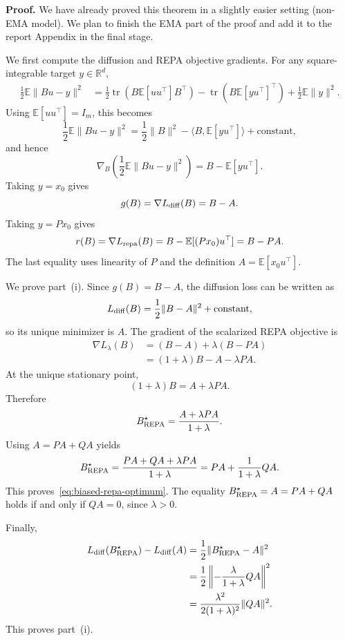 \textbf{Proof.} We have already proved this theorem in a slightly easier setting (non-EMA model).
We plan to finish the EMA part of the proof and add it to the report Appendix in the final stage.

We first compute the diffusion and REPA objective gradients. For any square-integrable target
$y\in\mathbb R^d$,
\begin{align*}
    \frac12\mathbb E\|Bu-y\|^2
    &=
    \frac12\operatorname{tr}\!\left(B\mathbb E[uu^\top]B^\top\right)
    -\operatorname{tr}\!\left(B\mathbb E[yu^\top]^\top\right)
    +\frac12\mathbb E\|y\|^2 .
\end{align*}
Using $\mathbb E[uu^\top]=I_m$, this becomes
\[
    \frac12\mathbb E\|Bu-y\|^2
    =
    \frac12\|B\|^2
    -\langle B,\mathbb E[yu^\top]\rangle
    +\text{constant},
\]
and hence
\begin{equation}
    \nabla_B\left(\frac12\mathbb E\|Bu-y\|^2\right)
    =
    B-\mathbb E[yu^\top].
    \label{eq:generic-gradient}
\end{equation}
Taking $y=x_0$ gives
\begin{equation}
    g(B)=\nabla L_{\rm diff}(B)=B-A .
    \label{eq:g-gradient}
\end{equation}
Taking $y=Px_0$ gives
\begin{equation}
    r(B)=\nabla L_{\rm repa}(B)
    = B-\mathbb E[(Px_0)u^\top]
    = B-PA .
    \label{eq:r-gradient}
\end{equation}
The last equality uses linearity of $P$ and the definition $A=\mathbb E[x_0u^\top]$.

We prove part~\textup{(i)}. Since $g(B)=B-A$, the diffusion loss can be written
as
\[
    L_{\rm diff}(B)=\frac12\|B-A\|^2+\text{constant},
\]
so its unique minimizer is $A$. The gradient of the scalarized REPA objective is
\begin{align*}
    \nabla L_\lambda(B)
    &=
    (B-A)+\lambda(B-PA) \\
    &=
    (1+\lambda)B-A-\lambda PA .
\end{align*}
At the unique stationary point,
\[
    (1+\lambda)B=A+\lambda PA .
\]
Therefore
\[
    B^\star_{\rm REPA}
    =
    \frac{A+\lambda PA}{1+\lambda} .
\]
Using $A=PA+QA$ yields
\[
    B^\star_{\rm REPA}
    =
    \frac{PA+QA+\lambda PA}{1+\lambda}
    =
    PA+\frac{1}{1+\lambda}QA .
\]
This proves~\eqref{eq:biased-repa-optimum}. The equality
$B^\star_{\rm REPA}=A=PA+QA$ holds if and only if $QA=0$, since $\lambda>0$.

Finally,
\begin{align*}
    L_{\rm diff}(B^\star_{\rm REPA})-L_{\rm diff}(A)
    &=
    \frac12\|B^\star_{\rm REPA}-A\|^2 \\
    &=
    \frac12\left\|-
    \frac{\lambda}{1+\lambda}QA\right\|^2 \\
    &=
    \frac{\lambda^2}{2(1+\lambda)^2}\|QA\|^2 .
\end{align*}
This proves part~\textup{(i)}.

